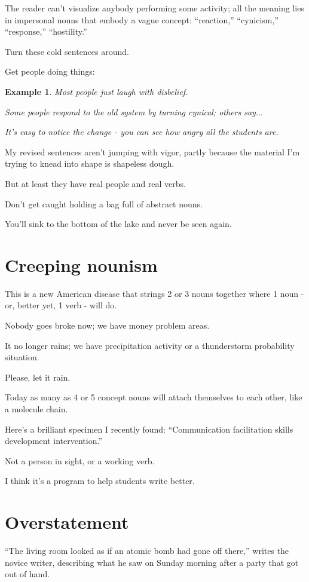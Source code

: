 \documentclass{book}
\numberwithin{equation}{section}
\newtheorem{example}{Example}[chapter]
\begin{document}
The reader can't visualize anybody performing some activity; all the meaning lies in impersonal nouns that embody a vague concept: ``reaction,'' ``cynicism,'' ``response,'' ``hostility.''

Turn these cold sentences around.

Get people doing things:
\begin{example}
    Most people just laugh with disbelief.
    
    Some people respond to the old system by turning cynical; others say$\ldots$
    
    It's easy to notice the change - you can see how angry all the students are.
\end{example}
My revised sentences aren't jumping with vigor, partly because the material I'm trying to knead into shape is shapeless dough.

But at least they have real people and real verbs.

Don't get caught holding a bag full of abstract nouns.

You'll sink to the bottom of the lake and never be seen again.

\section{Creeping nounism}
This is a new American disease that strings 2 or 3 nouns together where 1 noun - or, better yet, 1 verb - will do.

Nobody goes broke now; we have money problem areas.

It no longer rains; we have precipitation activity or a thunderstorm probability situation.

Please, let it rain.

%
Today as many as 4 or 5 concept nouns will attach themselves to each other, like a molecule chain.

Here's a brilliant specimen I recently found: ``Communication facilitation skills development intervention.''

Not a person in sight, or a working verb.

I think it's a program to help students write better.

\section{Overstatement}
``The living room looked as if an atomic bomb had gone off there,'' writes the novice writer, describing what he saw on Sunday morning after a party that got out of hand.
\end{document}

